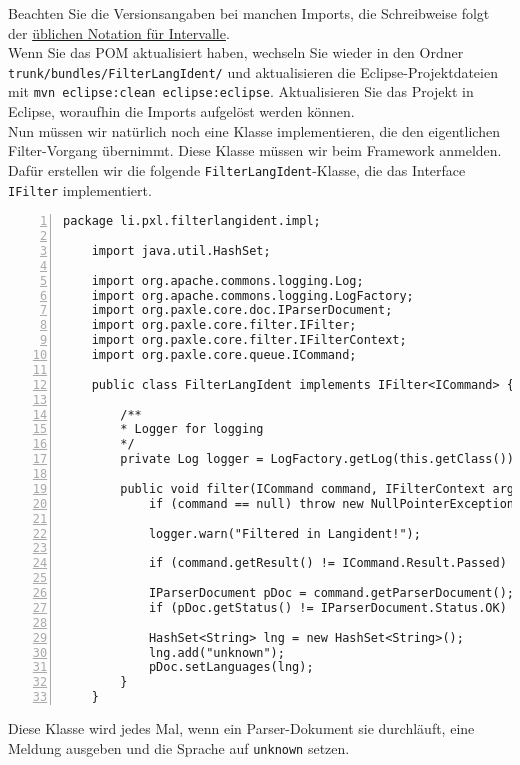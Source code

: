 \documentclass[a4paper,12pt]{scrartcl}
\begin{document}
Beachten Sie die Versionsangaben bei manchen Imports, die Schreibweise folgt der \href{http://docs.codehaus.org/display/MAVEN/Dependency+Mediation+and+Conflict+Resolution#DependencyMediationandConflictResolution-DependencyVersionRanges}{üblichen Notation für Intervalle}.\\
Wenn Sie das POM aktualisiert haben, wechseln Sie wieder in den Ordner \lstinline[breaklines=false, basicstyle=\itshape]|trunk/bundles/FilterLangIdent/| und aktualisieren die Eclipse-Projektdateien mit \lstinline[breaklines=false, basicstyle=\itshape]|mvn eclipse:clean eclipse:eclipse|. Aktualisieren Sie das Projekt in Eclipse, woraufhin die Imports aufgelöst werden können.\\
Nun müssen wir natürlich noch eine Klasse implementieren, die den eigentlichen Filter-Vorgang übernimmt. Diese Klasse müssen wir beim Framework anmelden.
Dafür erstellen wir die folgende \lstinline[breaklines=false, basicstyle=\itshape]|FilterLangIdent|-Klasse, die das Interface \lstinline[breaklines=false, basicstyle=\itshape]|IFilter| implementiert.
\begin{lstlisting}[numbers=left, caption=FilterLangIdent.java]
	package li.pxl.filterlangident.impl;
	
	import java.util.HashSet;
	
	import org.apache.commons.logging.Log;
	import org.apache.commons.logging.LogFactory;
	import org.paxle.core.doc.IParserDocument;
	import org.paxle.core.filter.IFilter;
	import org.paxle.core.filter.IFilterContext;
	import org.paxle.core.queue.ICommand;
	
	public class FilterLangIdent implements IFilter<ICommand> {
	
		/**
		* Logger for logging
		*/
		private Log logger = LogFactory.getLog(this.getClass());
	
		public void filter(ICommand command, IFilterContext arg1) {
			if (command == null) throw new NullPointerException("The command object is null.");
	
			logger.warn("Filtered in Langident!");
			
			if (command.getResult() != ICommand.Result.Passed) return;
	
			IParserDocument pDoc = command.getParserDocument();
			if (pDoc.getStatus() != IParserDocument.Status.OK) return;
	
			HashSet<String> lng = new HashSet<String>();
			lng.add("unknown");
			pDoc.setLanguages(lng);	
		}
	}
\end{lstlisting}
Diese Klasse wird jedes Mal, wenn ein Parser-Dokument sie durchläuft, eine Meldung ausgeben und die Sprache auf \lstinline[breaklines=false, basicstyle=\itshape]|unknown| setzen.\\
\end{document}
